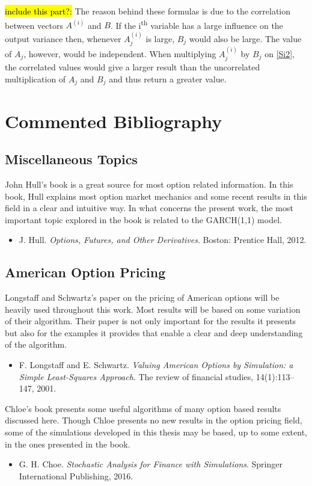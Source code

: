 \documentclass[a4paper,twocolumn,aps,prd,longbibliography,superscriptaddress]{revtex4-1}
\begin{document}
\hl{include this part?:}
The reason behind these formulas is due to the correlation between vectors $A^{(i)}$ and $B$. If the i\textsuperscript{th} variable has a large influence on the output variance then, whenever $A^{(i)}_j$ is large, $B_j$ would also be large. The value of $A_j$, however, would be independent. When multiplying $A^{(i)}_j$ by $B_j$ on \ref{Si2}, the correlated values would give a larger result than the uncorrelated multiplication of $A_j$ and $B_j$ and thus return a greater value.


\section{Commented Bibliography}
\subsection{Miscellaneous Topics}

John Hull's book is a great source for most option related information. In this book, Hull explains most option market mechanics and some recent results in this field in a clear and intuitive way. In what concerns the present work, the most important topic explored in the book is related to the GARCH(1,1) model.
\begin{itemize}
\item J. Hull. \textit{Options, Futures, and Other Derivatives}. Boston: Prentice Hall, 2012.
\end{itemize}

\subsection{American Option Pricing}
Longstaff and Schwartz's paper on the pricing of American options will be heavily used throughout this work. Most results will be based on some variation of their algorithm. Their paper is not only important for the results it presents but also for the examples it provides that enable a clear and deep understanding of the algorithm.
\begin{itemize}
\item  F. Longstaff and E. Schwartz. \textit{Valuing American Options by Simulation: a Simple Least-Squares Approach}. The review of financial studies, 14(1):113–147, 2001.
\end{itemize}

Chloe's book presents some useful algorithms of many option based results discussed here. Though Chloe presents no new results in the option pricing field, some of the simulations developed in this thesis may be based, up to some extent, in the ones presented in the book.
\begin{itemize}
\item G. H. Choe. \textit{Stochastic Analysis for Finance with Simulations}. Springer International Publishing, 2016.
\end{itemize}
\end{document}
